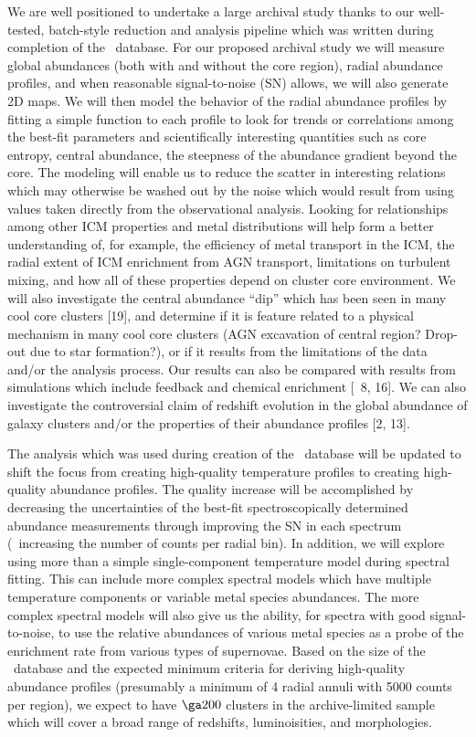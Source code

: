 \documentclass[letterpaper,11pt]{article}
\begin{document}
We are well positioned to undertake a large archival study thanks to
our well-tested, batch-style reduction and analysis pipeline which was
written during completion of the \accept\ database. For our proposed
archival study we will measure global abundances (both with and
without the core region), radial abundance profiles, and when
reasonable signal-to-noise (SN) allows, we will also generate 2D maps.
We will then model the behavior of the radial abundance profiles by
fitting a simple function to each profile to look for trends or
correlations among the best-fit parameters and scientifically
interesting quantities such as core entropy, central abundance, the
steepness of the abundance gradient beyond the core. The modeling will
enable us to reduce the scatter in interesting relations which may
otherwise be washed out by the noise which would result from using
values taken directly from the observational analysis. Looking for
relationships among other ICM properties and metal distributions will
help form a better understanding of, for example, the efficiency of
metal transport in the ICM, the radial extent of ICM enrichment from
AGN transport, limitations on turbulent mixing, and how all of these
properties depend on cluster core environment. We will also
investigate the central abundance ``dip'' which has been seen in many
cool core clusters [19], and determine if it is feature related to a
physical mechanism in many cool core clusters (AGN excavation of
central region? Drop-out due to star formation?), or if it results
from the limitations of the data and/or the analysis process. Our
results can also be compared with results from simulations which
include feedback and chemical enrichment [\eg\ 8, 16]. We can also
investigate the controversial claim of redshift evolution in the
global abundance of galaxy clusters and/or the properties of their
abundance profiles [2, 13].

The analysis which was used during creation of the \accept\ database
will be updated to shift the focus from creating high-quality
temperature profiles to creating high-quality abundance profiles. The
quality increase will be accomplished by decreasing the uncertainties
of the best-fit spectroscopically determined abundance measurements
through improving the SN in each spectrum (\ie\ increasing the number
of counts per radial bin). In addition, we will explore using more
than a simple single-component temperature model during spectral
fitting. This can include more complex spectral models which have
multiple temperature components or variable metal species
abundances. The more complex spectral models will also give us the
ability, for spectra with good signal-to-noise, to use the relative
abundances of various metal species as a probe of the enrichment rate
from various types of supernovae. Based on the size of the
\accept\ database and the expected minimum criteria for deriving
high-quality abundance profiles (presumably a minimum of 4 radial
annuli with 5000 counts per region), we expect to have $\ga 200$
clusters in the archive-limited sample which will cover a broad range
of redshifts, luminoisities, and morphologies.
\end{document}
